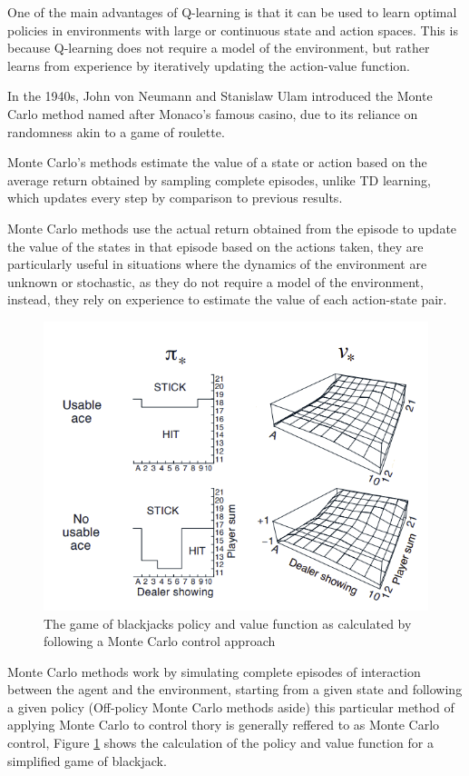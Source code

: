 One of the main advantages of Q-learning is that it can be used to learn optimal policies in environments with large or continuous state and action spaces. This is because Q-learning does not require a model of the environment, but rather learns from experience by iteratively updating the action-value function.

In the 1940s, John von Neumann and Stanislaw Ulam introduced the Monte Carlo method named after Monaco's famous casino, due to its reliance on randomness akin to a game of roulette.

Monte Carlo's methods estimate the value of a state or action based on the average return obtained by sampling complete episodes, unlike TD learning, which updates every step by comparison to previous results.

Monte Carlo methods use the actual return obtained from the episode to update the value of the states in that episode based on the actions taken, they are particularly useful in situations where the dynamics of the environment are unknown or stochastic, as they do not require a model of the environment, instead, they rely on experience to estimate the value of each action-state pair.

\begin{figure}[!h]
    \centering
    \includegraphics[width=.7\textwidth]{fig/rl/Monte Carlo Blackjack convergence.png}
    \caption{The game of blackjacks policy and value function as calculated by following a Monte Carlo control approach}
    \label{fig:monte-carlo}
\end{figure}

Monte Carlo methods work by simulating complete episodes of interaction between the agent and the environment, starting from a given state and following a given policy (Off-policy Monte Carlo methods aside) this particular method of applying Monte Carlo to control thory is generally reffered to as Monte Carlo control, Figure \ref{fig:monte-carlo} shows the calculation of the policy and value function for a simplified game of blackjack.

